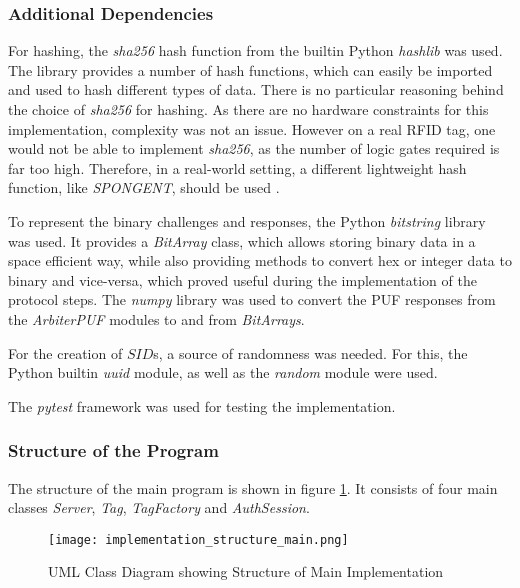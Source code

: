 \subsubsection{Additional Dependencies}

For hashing, the \emph{sha256} hash function from the builtin Python \emph{hashlib} was used.
The library provides a number of hash functions, which can easily be imported and used to hash different types of data.
There is no particular reasoning behind the choice of \emph{sha256} for hashing. As there are no hardware constraints
for this implementation, complexity was not an issue. However on a real RFID tag, one would not be able
to implement \emph{sha256}, as the number of logic gates required is far too high.
Therefore, in a real-world setting, a different lightweight hash function, like \emph{SPONGENT}, should be used \cite[][p. 2]{Zhu2019}.

To represent the binary challenges and responses, the Python \emph{bitstring} library was used.
It provides a \emph{BitArray} class, which allows storing binary data in a space efficient way, while also
providing methods to convert hex or integer data to binary and vice-versa, which proved useful during the
implementation of the protocol steps.
The \emph{numpy} library was used to convert the PUF responses from the \emph{ArbiterPUF} modules to and from \emph{BitArrays}.

For the creation of $SID$s, a source of randomness was needed. For this, the Python builtin \emph{uuid} module,
as well as the \emph{random} module were used.

The \emph{pytest} framework was used for testing the implementation.

\subsubsection{Structure of the Program}

The structure of the main program is shown in figure \ref{fig:implementation_structure_main}.
It consists of four main classes \emph{Server}, \emph{Tag}, \emph{TagFactory} and \emph{AuthSession}.

\begin{figure}[H]
    \centering
    \caption{UML Class Diagram showing Structure of Main Implementation}
    \label{fig:implementation_structure_main}
    \texttt{[image: implementation\_structure\_main.png]}
\end{figure}

